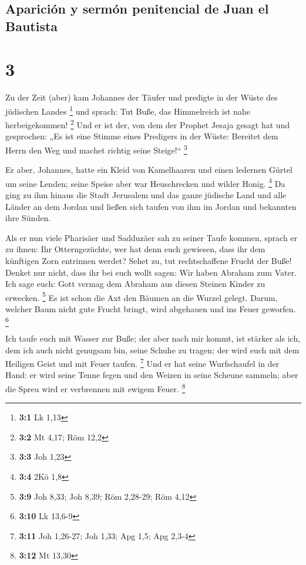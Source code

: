 \hypertarget{apariciuxf3n-y-sermuxf3n-penitencial-de-juan-el-bautista}{%
\subsection{Aparición y sermón penitencial de Juan el
Bautista}\label{apariciuxf3n-y-sermuxf3n-penitencial-de-juan-el-bautista}}

\hypertarget{section-2}{%
\section{3}\label{section-2}}

 Zu der Zeit (aber) kam Johannes der Täufer und predigte
in der Wüste des jüdischen Landes \footnote{\textbf{3:1} Lk 1,13}
 und sprach: Tut Buße, das Himmelreich ist nahe
herbeigekommen! \footnote{\textbf{3:2} Mt 4,17; Röm 12,2} 
Und er ist der, von dem der Prophet Jesaja gesagt hat und gesprochen:
„Es ist eine Stimme eines Predigers in der Wüste: Bereitet dem Herrn den
Weg und machet richtig seine Steige!{}`` \footnote{\textbf{3:3} Joh 1,23}

 Er aber, Johannes, hatte ein Kleid von Kamelhaaren und
einen ledernen Gürtel um seine Lenden; seine Speise aber war
Heuschrecken und wilder Honig. \footnote{\textbf{3:4} 2Kö 1,8}
 Da ging zu ihm hinaus die Stadt Jerusalem und das ganze
jüdische Land und alle Länder an dem Jordan  und ließen
sich taufen von ihm im Jordan und bekannten ihre Sünden.

 Als er nun viele Pharisäer und Sadduzäer sah zu seiner
Taufe kommen, sprach er zu ihnen: Ihr Otterngezüchte, wer hat denn euch
gewiesen, dass ihr dem künftigen Zorn entrinnen werdet? 
Sehet zu, tut rechtschaffene Frucht der Buße!  Denket nur
nicht, dass ihr bei euch wollt sagen: Wir haben Abraham zum Vater. Ich
sage euch: Gott vermag dem Abraham aus diesen Steinen Kinder zu
erwecken. \footnote{\textbf{3:9} Joh 8,33; Joh 8,39; Röm 2,28-29; Röm
  4,12}  Es ist schon die Axt den Bäumen an die Wurzel
gelegt. Darum, welcher Baum nicht gute Frucht bringt, wird abgehauen und
ins Feuer geworfen. \footnote{\textbf{3:10} Lk 13,6-9}

 Ich taufe euch mit Wasser zur Buße; der aber nach mir
kommt, ist stärker als ich, dem ich auch nicht genugsam bin, seine
Schuhe zu tragen; der wird euch mit dem Heiligen Geist und mit Feuer
taufen. \footnote{\textbf{3:11} Joh 1,26-27; Joh 1,33; Apg 1,5; Apg
  2,3-4}  Und er hat seine Wurfschaufel in der Hand: er
wird seine Tenne fegen und den Weizen in seine Scheune sammeln; aber die
Spreu wird er verbrennen mit ewigem Feuer. \footnote{\textbf{3:12} Mt
  13,30}

